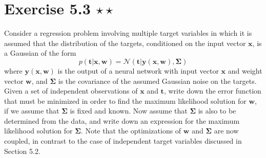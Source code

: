 \section*{Exercise 5.3 $\star \star$}
Consider a regression problem involving multiple target variables in which
it is assumed that the distribution of the targets, conditioned on the input
vector $\mathbf{x}$, is a Gaussian of the form
\begin{equation*}
    p(\mathbf{t} | \mathbf{x}, \mathbf{w}) 
    = \mathcal{N}(\mathbf{t} | \mathbf{y}(\mathbf{x}, \mathbf{w}), \mathbf{\Sigma})
    \tag{5.192}\label{eq:5.192}
\end{equation*}
where $\mathbf{y(x, w)}$ is the output of a neural network with input vector
$\mathbf{x}$ and weight vector $\mathbf{w}$, and $ \mathbf{\Sigma}$ is the
covariance of the assumed Gaussian noise on the targets. Given a set
of independent observations of $\mathbf{x}$ and $\mathbf{t}$, write down
the error function that must be minimized in order to find the maximum
likelihood solution for $\mathbf{w}$, if we assume that $ \mathbf{\Sigma}$
is fixed and known. Now assume that $ \mathbf{\Sigma}$ is also to be determined
from the data, and write down an expression for the maximum likelihood
solution for $ \mathbf{\Sigma}$. Note that the optimizations of
$\mathbf{w}$ and $\mathbf{\Sigma}$ are now coupled, in contrast to the
case of independent target variables discussed in Section 5.2.

\vspace{1em}

